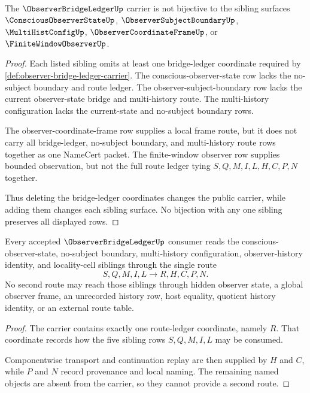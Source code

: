 \begin{theorem}
\label{thm:observer-bridge-ledger-independence-witness}
The $\ObserverBridgeLedgerUp$ carrier is not bijective to the sibling surfaces $\ConsciousObserverStateUp$, $\ObserverSubjectBoundaryUp$, $\MultiHistConfigUp$, $\ObserverCoordinateFrameUp$, or $\FiniteWindowObserverUp$.
\end{theorem}
\begin{proof}
Each listed sibling omits at least one bridge-ledger coordinate required by \autoref{def:observer-bridge-ledger-carrier}. The conscious-observer-state row lacks the no-subject boundary and route ledger. The observer-subject-boundary row lacks the current observer-state bridge and multi-history route. The multi-history configuration lacks the current-state and no-subject boundary rows.

The observer-coordinate-frame row supplies a local frame route, but it does not carry all bridge-ledger, no-subject boundary, and multi-history route rows together as one NameCert packet. The finite-window observer row supplies bounded observation, but not the full route ledger tying $S,Q,M,I,L,H,C,P,N$ together.

Thus deleting the bridge-ledger coordinates changes the public carrier, while adding them changes each sibling surface. No bijection with any one sibling preserves all displayed rows.
\end{proof}

\begin{theorem}
\label{thm:observer-bridge-ledger-sibling-route}
Every accepted $\ObserverBridgeLedgerUp$ consumer reads the conscious-observer-state, no-subject boundary, multi-history configuration, observer-history identity, and locality-cell siblings through the single route
$$
S,Q,M,I,L \longrightarrow R,H,C,P,N.
$$
No second route may reach those siblings through hidden observer state, a global observer frame, an unrecorded history row, host equality, quotient history identity, or an external route table.
\end{theorem}
\begin{proof}
The carrier contains exactly one route-ledger coordinate, namely $R$. That coordinate records how the five sibling rows $S,Q,M,I,L$ may be consumed.

Componentwise transport and continuation replay are then supplied by $H$ and $C$, while $P$ and $N$ record provenance and local naming. The remaining named objects are absent from the carrier, so they cannot provide a second route.
\end{proof}

